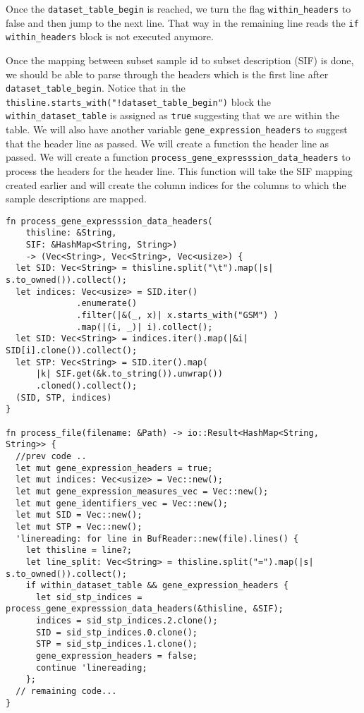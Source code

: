 \documentclass{book}
\begin{document}
Once the \lstinline{dataset_table_begin} is reached, we turn the flag \lstinline{within_headers} to false and then jump to the next line. That way in the remaining line reads the \lstinline{if within_headers} block is not executed anymore.

Once the mapping between subset sample id to subset description (SIF) is done, we should be able to parse through the headers which is the first line after \lstinline{dataset_table_begin}. Notice that in the \lstinline{thisline.starts_with("!dataset_table_begin")} block the \lstinline{within_dataset_table} is assigned as \lstinline{true} suggesting that we are within the table. We will also have another variable \lstinline{gene_expression_headers} to suggest that the header line as passed. We will create a function the header line as passed. We will create a function \lstinline{process_gene_expresssion_data_headers} to process the headers for the header line. This function will take the SIF mapping created earlier and will create the column indices for the columns to which the sample descriptions are mapped.

\begin{lstlisting}[caption={chapter7/statistics/src/main.rs}, basicstyle=\small]
fn process_gene_expresssion_data_headers(
    thisline: &String,
    SIF: &HashMap<String, String>)
    -> (Vec<String>, Vec<String>, Vec<usize>) {
  let SID: Vec<String> = thisline.split("\t").map(|s| s.to_owned()).collect();
  let indices: Vec<usize> = SID.iter()
              .enumerate()
              .filter(|&(_, x)| x.starts_with("GSM") )
              .map(|(i, _)| i).collect();
  let SID: Vec<String> = indices.iter().map(|&i| SID[i].clone()).collect();
  let STP: Vec<String> = SID.iter().map(
      |k| SIF.get(&k.to_string()).unwrap())
      .cloned().collect();
  (SID, STP, indices)
}

fn process_file(filename: &Path) -> io::Result<HashMap<String, String>> {
  //prev code ..
  let mut gene_expression_headers = true;
  let mut indices: Vec<usize> = Vec::new();
  let mut gene_expression_measures_vec = Vec::new();
  let mut gene_identifiers_vec = Vec::new();
  let mut SID = Vec::new();
  let mut STP = Vec::new();
  'linereading: for line in BufReader::new(file).lines() {
    let thisline = line?;
    let line_split: Vec<String> = thisline.split("=").map(|s| s.to_owned()).collect();
    if within_dataset_table && gene_expression_headers {
      let sid_stp_indices = process_gene_expresssion_data_headers(&thisline, &SIF);
      indices = sid_stp_indices.2.clone();
      SID = sid_stp_indices.0.clone();
      STP = sid_stp_indices.1.clone();
      gene_expression_headers = false;
      continue 'linereading;
    };
  // remaining code...
}
\end{lstlisting}
\end{document}
